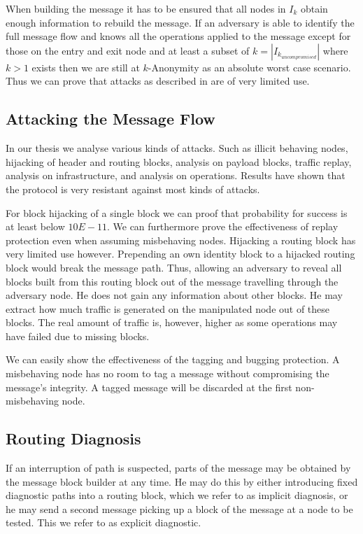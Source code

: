 \documentclass[9pt,journal,compsoc]{IEEEtran}
\begin{document}
When building the message it has to be ensured that all nodes in $I_k$ obtain enough information to rebuild the message. If an adversary is able to identify the full message flow and knows all the operations applied to the message except for those on the entry and exit node and at least a subset of $k=|I_{k_{uncompromised}}|$ where $k>1$ exists then we are still at $k$-Anonymity as an absolute worst case scenario. Thus we can prove that attacks as described in \cite{DanSer04} are of very limited use. 

\subsection{Attacking the Message Flow}
In our thesis\cite{messageVortex} we analyse various kinds of attacks. Such as illicit behaving nodes, hijacking of header and routing blocks, analysis on payload blocks, traffic replay, analysis on infrastructure, and analysis on operations. Results have shown that the protocol is very resistant against most kinds of attacks.

For block hijacking of a single block we can proof that probability for success is at least below $10E-11$. We can furthermore prove the effectiveness of replay protection even when assuming misbehaving nodes. Hijacking a routing block has very limited use however. Prepending an own identity block to a hijacked routing block would break the message path. Thus, allowing an adversary to reveal all blocks built from this routing block out of the message travelling through the adversary node. He does not gain any information about other blocks. He may extract how much traffic is generated on the manipulated node out of these blocks. The real amount of traffic is, however, higher as some operations may have failed due to missing blocks.

We can easily show the effectiveness of the tagging and bugging protection. A misbehaving node has no room to tag a message without compromising the message's integrity. A tagged message will be discarded at the first non-misbehaving node.

\subsection{Routing Diagnosis}
If an interruption of path is suspected, parts of the message may be obtained by the message block builder at any time. He may do this by either introducing fixed diagnostic paths into a routing block, which we refer to as implicit diagnosis, or he may send a second message picking up a block of the message at a node to be tested. This we refer to as explicit diagnostic.
\end{document}
